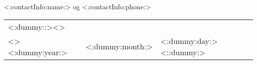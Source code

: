 \documentclass[10pt,a4paper]{article}
\begin{document}
	<:contactInfo:name:> og <:contactInfo:phone:>

	\begin{tabular}{lll}<:dummy::><>\\<>
		<:dummy:year:> & <:dummy:month:> & <:dummy:day:><::dummy:>
	\end{tabular}

	\vspace{1cm}

	
	
	
\end{document}
